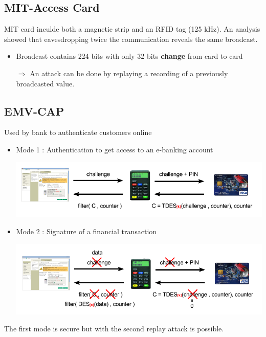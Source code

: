 \subsection{MIT-Access Card}

MIT card inculde both a magnetic strip and an RFID tag (125 kHz).
An analysis showed that eavesdropping twice the communication 
reveals the same broadcast.
\begin{itemize}
    \item Broadcast contains 224 bits with only 32 bits \textbf{change}
            from card to card
    \item[$\Rightarrow$]An attack can be done by replaying a recording
        of a previously broadcasted value.
\end{itemize}

\subsection{EMV-CAP}

Used by bank to authenticate customers online 
\begin{itemize}
	\item Mode 1 : Authentication to get access to an e-banking account 
	\begin{center}
		\includegraphics[scale=0.6]{img/mode1-ebanking}
	\end{center}
	
	\item Mode 2 : Signature of a financial transaction
	\begin{center}
		\includegraphics[scale=0.6]{img/mode2-ebanking}
	\end{center}
\end{itemize}
The first mode is secure but with the second replay attack is possible. %

